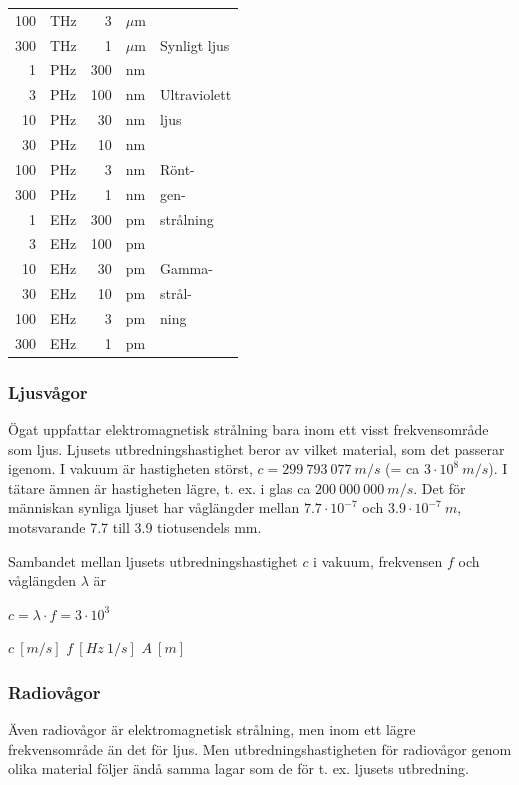 \begin{center}
\begin{tabular}{|rl|rl|l|}
100 & THz &   3 & \(\mu\)m & \\ \cline{5-5}
300 & THz &   1 & \(\mu\)m & Synligt ljus \\ \cline{5-5}
  1 & PHz & 300 & nm & \\
  3 & PHz & 100 & nm & Ultraviolett \\
 10 & PHz &  30 & nm & ljus \\ \cline{5-5}
 30 & PHz &  10 & nm & \\
100 & PHz &   3 & nm & Rönt-\\
300 & PHz &   1 & nm & gen-\\
  1 & EHz & 300 & pm & strålning\\ \cline{5-5}
  3 & EHz & 100 & pm & \\
 10 & EHz &  30 & pm & Gamma-\\
 30 & EHz &  10 & pm & strål-\\
100 & EHz &   3 & pm & ning\\
300 & EHz &   1 & pm & \\
\hline
\end{tabular}
\label{fig:BildII1-13}
\end{center}

\subsubsection{Ljusvågor}

Ögat uppfattar elektromagnetisk strålning bara inom ett visst frekvensområde
som ljus. Ljusets utbredningshastighet beror av vilket material, som det
passerar igenom. I vakuum är hastigheten störst, \(c = 299\ 793\ 077\ m/s\)
(= ca \(3 \cdot 10^8\ m/s\)). I tätare ämnen är hastigheten lägre, t. ex. i
glas ca \(200\ 000\ 000\ m/s\). Det för människan synliga ljuset har
våglängder mellan \(7.7 \cdot 10^{-7}\) och \(3.9 \cdot 10^{-7}\ m\), motsvarande
7.7 till 3.9 tiotusendels mm.

Sambandet mellan ljusets utbredningshastighet \(c\) i vakuum, frekvensen \(f\)
och våglängden \(\lambda\) är

\(c = \lambda \cdot f = 3 \cdot 10^3\)

\(c\ [m/s]\) \(f\ [Hz\ 1/s]\) \(A\ [m]\)

\subsubsection{Radiovågor}

Även radiovågor är elektromagnetisk strålning, men inom ett lägre
frekvensområde än det för ljus. Men utbredningshastigheten för radiovågor genom
olika material följer ändå samma lagar som de för t. ex. ljusets utbredning.


